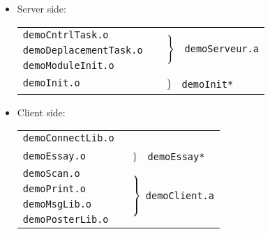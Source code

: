 \begin{itemize}
	\begin{itemize}
	\item Server side:

		\vspace{.3cm}
		{\small
		\begin{tabular}{ll}
		\cline{1-1}
		\tt demoCntrlTask.o &
			\multirow{3}{3.5cm}{\
			$\left.{\vrule width 0pt height .6cm} \right\}$ \
			\tt demoServeur.a} \\
		\tt demoDeplacementTask.o \\
		\tt demoModuleInit.o	\\
		\cline{1-1}
		\tt demoInit.o		
		    & 	\multirow{1}{3.5cm}{\
		      	$\left.{\vrule width 0pt} \right\}$
		      	\tt ~demoInit*}  \\
		\cline{1-1}
		\end{tabular}
		}
		\vspace{.3cm}

	\item Client side:

		\vspace{.3cm}
		{\small
		\begin{tabular}{ll}
		\cline{1-1}
		\tt demoConnectLib.o \\
		\cline{1-1}
		\tt demoEssay.o 
		    & 	\multirow{1}{3.5cm}{
		      	$\left.{\vrule width 0pt} \right\}$
		      	\tt ~demoEssay*}  \\
		\cline{1-1}
		\tt demoScan.o	
		    &	\multirow{4}{3.5cm}{
			$\left.{\vrule width 0pt height .8cm} \right\}$
			\tt demoClient.a}\\
		\tt demoPrint.o		\\
		\tt demoMsgLib.o	\\
		\tt demoPosterLib.o	\\
		\cline{1-1}
		\end{tabular}
		}
	\end{itemize}

\end{itemize}
